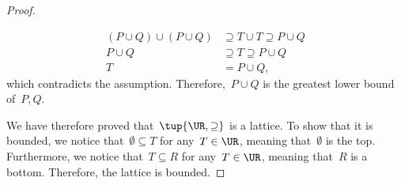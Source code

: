\begin{proof}
\begin{compactitem}
\begin{equation}
\begin{aligned}
      (P\cup Q)
        \cup (P\cup Q) &\supseteq T \cup T \supseteq P\cup Q\\
        P\cup Q &\supseteq T\supseteq P\cup Q\\
        T&=P\cup Q,
      \end{aligned}
    \end{equation}
    which contradicts the assumption. Therefore,~$P\cup Q$ is the greatest lower bound of~$P,Q$.
  \end{compactitem}
  We have therefore proved that~$\tup{\UR,\supseteq}$ is a lattice. To show that it is bounded, we notice that~$\emptyset \subseteq T$ for any~$T\in \UR$, meaning that~$\emptyset$ is the top. Furthermore, we notice that~$T\subseteq R$ for any~$T\in \UR$, meaning that~$R$ is a bottom. Therefore, the lattice is bounded.
\end{proof}


